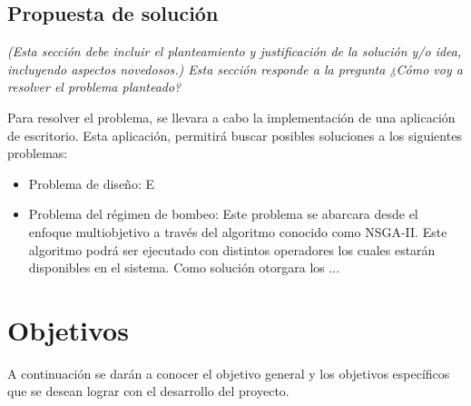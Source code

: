 \documentclass[11pt,letterpaper]{article}
\begin{document}
\subsection{Propuesta de solución}
\emph{(Esta sección debe incluir el planteamiento y justificación de la solución y/o idea, incluyendo aspectos novedosos.) Esta sección responde a la pregunta ¿Cómo voy a resolver el problema planteado?}

Para resolver el problema, se llevara a cabo la implementación de una aplicación de escritorio. Esta aplicación, permitirá buscar posibles soluciones a los siguientes problemas:

\begin{itemize}
	\item Problema de diseño: E
	\item Problema del régimen de bombeo: Este problema se abarcara desde el enfoque multiobjetivo a través del algoritmo conocido como NSGA-II. Este algoritmo podrá ser ejecutado con distintos operadores los cuales estarán disponibles en el sistema. Como solución otorgara los ...
\end{itemize}

\section{Objetivos}

A continuación se darán a conocer el objetivo general y los objetivos específicos que se desean lograr con el desarrollo del proyecto.
\end{document}
